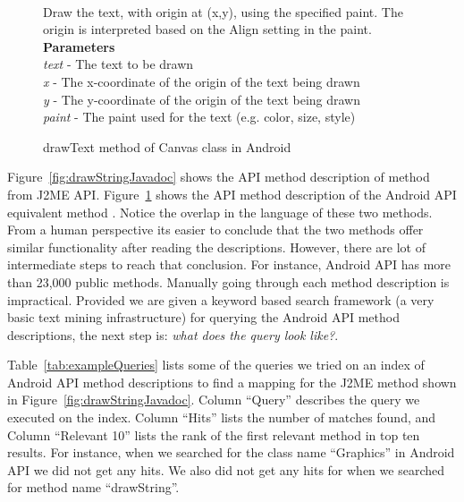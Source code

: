 \begin{figure}
	\begin{framed}
		\begin{small}
			\\
			Draw the text, with origin at (x,y), using the specified paint. The origin is interpreted based on the Align setting in the paint.\\
			\textbf{Parameters}\\
			\textit{text} - The text to be drawn\\
			\textit{x} - The x-coordinate of the origin of the text being drawn\\
			\textit{y} - The y-coordinate of the origin of the text being drawn\\
			\textit{paint} - The paint used for the text (e.g. color, size, style)\\
		\end{small}
	\end{framed}
	\caption{drawText method of Canvas class in Android}
	\label{fig:drawTextJavadoc}
\end{figure}


Figure~\ref{fig:drawStringJavadoc} shows the API method description of  method from J2ME API.
Figure~\ref{fig:drawTextJavadoc} shows the API method description of the Android API equivalent method .
Notice the overlap in the language of these two methods.
From a human perspective its easier to conclude that the two methods offer similar
functionality after reading the descriptions.
However, there are lot of intermediate steps to reach that conclusion.
For instance, Android API has more than 23,000 public methods.
Manually going through each method description is impractical.
Provided we are given a keyword based search framework (a very basic text mining infrastructure) for querying the Android API method descriptions, the next step is: \textit{what does the query look like?}.

Table~\ref{tab:exampleQueries} lists some of the queries we tried on an index of Android API method descriptions to find a mapping for the J2ME method  shown in Figure~\ref{fig:drawStringJavadoc}. 
Column ``Query'' describes the query we executed on the index. Column ``Hits'' lists the number of matches found, and Column ``Relevant 10'' lists the rank of the first relevant method in top ten results. For instance, when we searched for the class name ``Graphics'' in Android API we did not get any hits. We also did not get any hits for when we searched for method name ``drawString''. 

